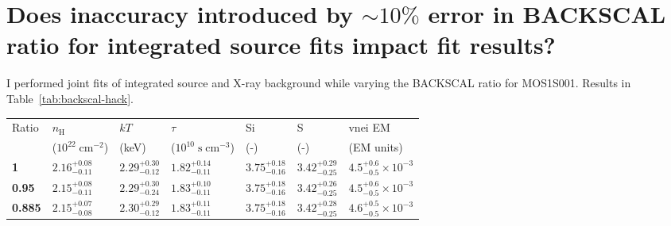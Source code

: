 \documentclass[preprint2,tighten,trackchanges]{aastex6}
\newcommand*{\mt}{\mathrm}
\newcommand*{\unit}[1]{\;\mt{#1}}  %
\newcommand*{\abt}{\mathord{\sim}} %
\begin{document}
\section{Does inaccuracy introduced by $\abt 10\%$ error in BACKSCAL ratio for
integrated source fits impact fit results?}

I performed joint fits of integrated source and X-ray background while
varying the BACKSCAL ratio for MOS1S001.
Results in Table~\ref{tab:backscal-hack}.

\begin{table*}[!h]
    \centering
    \caption{2009 (Motch) MOS1 BACKSCAL ratio has very little effect on fits
        \label{tab:backscal-hack}}

    \begin{tabular}{@{}lllllll@{}}
    \toprule
    Ratio & $n_\mathrm{H}$ & $kT$ & $\tau$ & Si & S & vnei EM \\
     & ($10^{22} \unit{cm^{-2}}$) & (keV) & ($10^{10} \unit{s\;cm^{-3}}$) & (-) & (-) & (EM units) \\
    \midrule
    \textbf{1}     & ${2.16}^{+0.08}_{-0.11}$ & ${2.29}^{+0.30}_{-0.12}$ & ${1.82}^{+0.14}_{-0.11}$
          & ${3.75}^{+0.18}_{-0.16}$ & ${3.42}^{+0.29}_{-0.25}$ & ${4.5}^{+0.6}_{-0.5} \times 10^{-3}$ \\
    \textbf{0.95}  & $2.15^{+0.08}_{-0.11}$ & $2.29^{+0.30}_{-0.24}$ & $1.83^{+0.10}_{-0.11}$  %
          & $3.75^{+0.18}_{-0.16}$ & $3.42^{+0.26}_{-0.25}$ & $4.5^{+0.6}_{-0.5} \times 10^{-3}$ \\ %
    \textbf{0.885} & ${2.15}^{+0.07}_{-0.08}$ & ${2.30}^{+0.29}_{-0.12}$ & ${1.83}^{+0.11}_{-0.11}$
          & ${3.75}^{+0.18}_{-0.16}$ & ${3.42}^{+0.28}_{-0.25}$ & ${4.6}^{+0.5}_{-0.5} \times 10^{-3}$ \\
    \bottomrule
    \end{tabular}

    \quad
    \quad


\end{table*}
\end{document}
